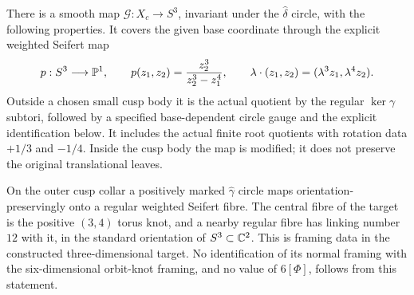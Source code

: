 \begin{proposition}
There is a smooth map $\mathcal G:X_c\to S^3$, invariant under
the $\widehat\delta$ circle, with the following properties.
It covers the given base coordinate through the explicit weighted
Seifert map
\[
 p:S^3\longrightarrow\mathbb P^1,\qquad
 p(z_1,z_2)=\frac{z_2^3}{z_2^3-z_1^4},\qquad
 \lambda\cdot(z_1,z_2)=(\lambda^3z_1,\lambda^4z_2).
\]
Outside a chosen small cusp body it is the actual quotient by
the regular $\ker\gamma$ subtori, followed by a specified
base-dependent circle gauge and the explicit identification below.
It includes the actual finite root quotients with rotation data
$+1/3$ and $-1/4$. Inside the cusp body the map is modified;
it does not preserve the original translational leaves.

On the outer cusp collar a positively marked $\widehat\gamma$
circle maps orientation-preservingly onto a regular weighted
Seifert fibre. The central fibre of the target is the positive
$(3,4)$ torus knot, and a nearby regular fibre has linking number
$12$ with it, in the standard orientation of $S^3\subset\mathbb C^2$.
This is framing data in the constructed three-dimensional target.
No identification of its normal framing with the six-dimensional
orbit-knot framing, and no value of $6[\Phi]$, follows from this
statement.
\end{proposition}

